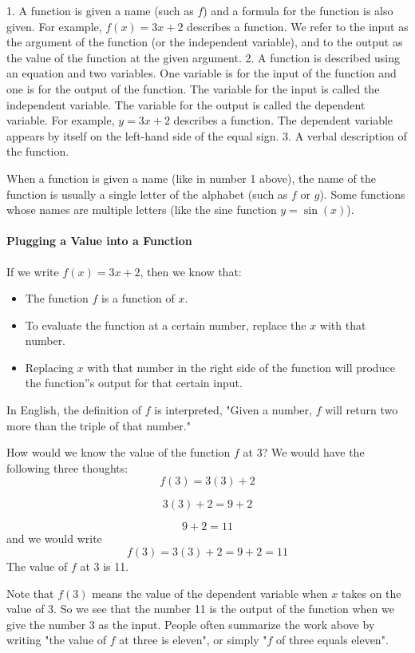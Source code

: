 1. A function is given a name (such as $f$) and a formula for the function is also given. For example, $f(x) = 3x + 2$ describes a function. We refer to the input as the argument of the function (or the independent variable), and to the output as the value of the function at the given argument.
2. A function is described using an equation and two variables. One variable is for the input of the function and one is for the output of the function. The variable for the input is called the independent variable. The variable for the output is called the dependent variable. For example, $y = 3x + 2$ describes a function. The dependent variable appears by itself on the left-hand side of the equal sign.
3. A verbal description of the function.

When a function is given a name (like in number 1 above), the name of the function is usually a single letter of the alphabet (such as $f$ or $g$). Some functions whose names are multiple letters (like the sine function $y = \sin(x)$).

\paragraph{Plugging a Value into a Function}

If we write $f(x) = 3x + 2$, then we know that:

\begin{itemize}
    \item The function $f$ is a function of $x$.
    \item To evaluate the function at a certain number, replace the $x$ with that number.
    \item Replacing $x$ with that number in the right side of the function will produce the function''s output for that certain input.
\end{itemize}

In English, the definition of $f$ is interpreted, "Given a number, $f$ will return two more than the triple of that number."

How would we know the value of the function $f$ at 3? We would have the following three thoughts:
$$
f(3) = 3(3) + 2
$$

$$
3(3) + 2 = 9 + 2
$$

$$
9 + 2 = 11
$$
and we would write
$$
f(3) = 3(3) + 2 = 9 + 2 = 11
$$
The value of $f$ at 3 is 11.

Note that $f(3)$ means the value of the dependent variable when $x$ takes on the value of 3. So we see that the number 11 is the output of the function when we give the number 3 as the input. People often summarize the work above by writing "the value of $f$ at three is eleven", or simply "$f$ of three equals eleven".

